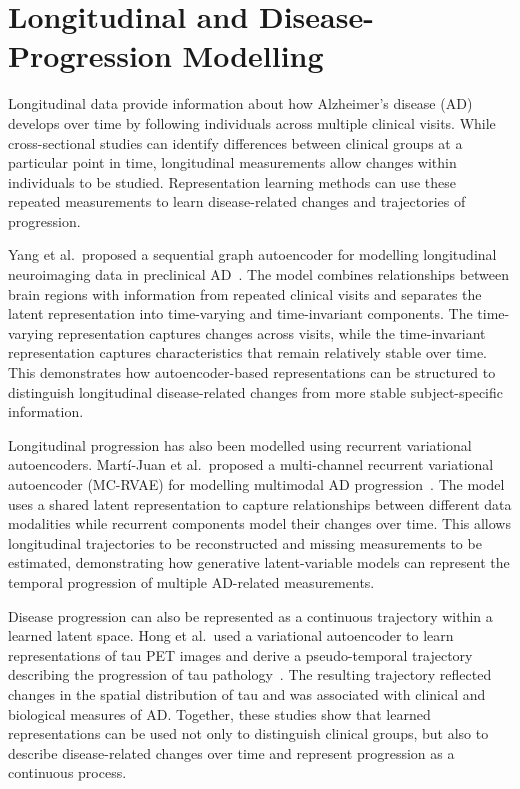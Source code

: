 \section{Longitudinal and Disease-Progression Modelling}

Longitudinal data provide information about how Alzheimer’s disease (AD) develops over time by following individuals across multiple clinical visits. 
While cross-sectional studies can identify differences between clinical groups at a particular point in time, longitudinal measurements allow changes within individuals to be studied. 
Representation learning methods can use these repeated measurements to learn disease-related changes and trajectories of progression.

Yang et al.\ proposed a sequential graph autoencoder for modelling longitudinal neuroimaging data in preclinical AD~\cite{Yang2021}. The model combines relationships between brain regions with information from repeated clinical visits and separates the latent representation into time-varying and time-invariant components. 
The time-varying representation captures changes across visits, while the time-invariant representation captures characteristics that remain relatively stable over time. 
This demonstrates how autoencoder-based representations can be structured to distinguish longitudinal disease-related changes from more stable subject-specific information.

Longitudinal progression has also been modelled using recurrent variational autoencoders. 
Martí-Juan et al.\ proposed a multi-channel recurrent variational autoencoder (MC-RVAE) for modelling multimodal AD progression~\cite{MartiJuan2023}. 
The model uses a shared latent representation to capture relationships between different data modalities while recurrent components model their changes over time. 
This allows longitudinal trajectories to be reconstructed and missing measurements to be estimated, demonstrating how generative latent-variable models can represent the temporal progression of multiple AD-related measurements.

Disease progression can also be represented as a continuous trajectory within a learned latent space. 
Hong et al.\ used a variational autoencoder to learn representations of tau PET images and derive a pseudo-temporal trajectory describing the progression of tau pathology~\cite{Hong2022}. 
The resulting trajectory reflected changes in the spatial distribution of tau and was associated with clinical and biological measures of AD.\@ 
Together, these studies show that learned representations can be used not only to distinguish clinical groups, but also to describe disease-related changes over time and represent progression as a continuous process.
